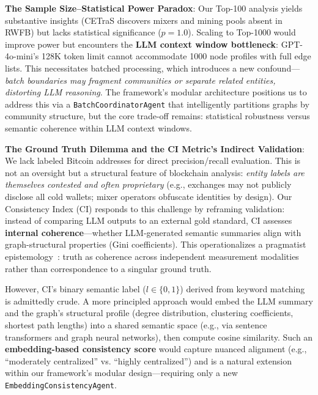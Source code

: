 \textbf{The Sample Size--Statistical Power Paradox}: Our Top-100 analysis yields substantive insights (CETraS discovers mixers and mining pools absent in RWFB) but lacks statistical significance ($p{=}1.0$). Scaling to Top-1000 would improve power but encounters the \textbf{LLM context window bottleneck}: GPT-4o-mini's 128K token limit cannot accommodate 1000 node profiles with full edge lists. This necessitates batched processing, which introduces a new confound---\textit{batch boundaries may fragment communities or separate related entities, distorting LLM reasoning}. The framework's modular architecture positions us to address this via a \texttt{BatchCoordinatorAgent} that intelligently partitions graphs by community structure, but the core trade-off remains: statistical robustness versus semantic coherence within LLM context windows.

\textbf{The Ground Truth Dilemma and the CI Metric's Indirect Validation}: We lack labeled Bitcoin addresses for direct precision/recall evaluation. This is not an oversight but a structural feature of blockchain analysis: \textit{entity labels are themselves contested and often proprietary} (e.g., exchanges may not publicly disclose all cold wallets; mixer operators obfuscate identities by design). Our Consistency Index (CI) responds to this challenge by reframing validation: instead of comparing LLM outputs to an external gold standard, CI assesses \textbf{internal coherence}---whether LLM-generated semantic summaries align with graph-structural properties (Gini coefficients). This operationalizes a pragmatist epistemology~\cite{dewey1938logic}: truth as coherence across independent measurement modalities rather than correspondence to a singular ground truth.

However, CI's binary semantic label ($l \in \{0,1\}$) derived from keyword matching is admittedly crude. A more principled approach would embed the LLM summary and the graph's structural profile (degree distribution, clustering coefficients, shortest path lengths) into a shared semantic space (e.g., via sentence transformers and graph neural networks), then compute cosine similarity. Such an \textbf{embedding-based consistency score} would capture nuanced alignment (e.g., ``moderately centralized'' vs. ``highly centralized'') and is a natural extension within our framework's modular design---requiring only a new \texttt{EmbeddingConsistencyAgent}.

